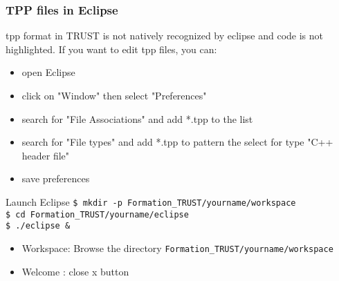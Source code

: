 \documentclass[10pt, hyperref={unicode=true,pdfusetitle, bookmarks=true,bookmarksnumbered=false,bookmarksopen=false, breaklinks=false,pdfborder={0 0 1},backref=true,colorlinks=true,linkcolor=darkblue,pageanchor, urlcolor=darkblue}]{beamer}
\begin{document}
\begin{frame}
\begin{columns}[c] 
\tableofcontents[sections={1-4},currentsection, currentsubsection]
\tableofcontents[sections={5-10},currentsection, currentsubsection]
\end{columns}
\end{frame}
\begin{frame}
\frametitle{TPP files in Eclipse}

\begin{block}{}
tpp format in TRUST is not natively recognized by eclipse and code is not highlighted. If you want to edit tpp files, you can:
\begin{itemize}
\item open Eclipse
\item click on "Window" then select "Preferences"
\item search for "File Associations" and add *.tpp to the list
\item search for "File types" and add *.tpp to pattern the select for type "C++ header file"
\item save preferences
\end{itemize}
\end{block}

\begin{exampleblock}{Launch Eclipse}
\texttt{\$ mkdir -p Formation\_TRUST/yourname/workspace}\\
\texttt{\$ cd Formation\_TRUST/yourname/eclipse}\\
\texttt{\$ ./eclipse \&}
%
\begin{itemize}
\item Workspace: Browse the directory \texttt{Formation\_TRUST/yourname/workspace} 
\item Welcome : close x button
\end{itemize}
%
\end{exampleblock}

\end{frame}
\end{document}
